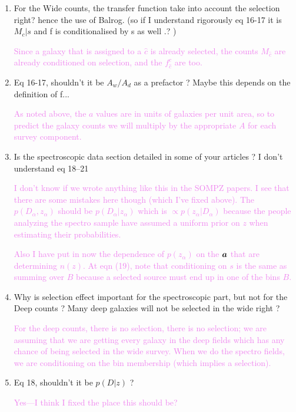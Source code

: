\documentclass[11pt,preprint,flushrt]{aastex631}
\newcommand{\veca}{\mbox{\boldmath $a$}}
\newcommand\answer[1]{\textcolor{violet}{#1}}
\begin{document}
\begin{enumerate}
\item For the Wide counts, the transfer function take into account the
selection right? hence the use of Balrog. (so if I understand
rigorously eq 16-17 it is $M_c|s$ and f is conditionalised by s as well
.? )

\answer{Since a galaxy that is assigned to a $\hat c$ is already
  selected, the counts $M_{\hat c}$ are already conditioned on
  selection, and the $f^c_{\hat c}$ are too.}

\item Eq 16-17, shouldn't it be $A_w/A_d$ as a prefactor ? Maybe this
  depends on the definition of f...

\answer{As noted above, the $a$ values are in units of galaxies per
  unit area, so to predict the galaxy counts we will multiply by the
  appropriate $A$ for each survey component.}
  
\item Is the spectroscopic data section detailed in some of your articles ?
  I don't understand eq 18--21

  \answer{I don't know if we wrote anything like this in the SOMPZ
    papers.  I see that there are some mistakes here though (which
    I've fixed above).  The $p(D_\alpha, z_\alpha)$ should be
    $p(D_\alpha | z_\alpha)$ which is $\propto p(z_\alpha | D_\alpha)$
    because the people analyzing the spectro sample have assumed a
    uniform prior on $z$ when estimating their probabilities.}

\answer{Also I have put in now the dependence of $p(z_\alpha)$ on the
  $\veca$ that are determining $n(z)$.  At eqn (19), note that
  conditioning on $s$ is the same as summing over $B$ because a
  selected source must end up in one of the bins $B$.}

\item Why is selection effect important for the spectroscopic part, but not
for the Deep counts ? Many  deep galaxies will not be selected in the
wide right ?

\answer{For the deep counts, there is no selection, there is no
  selection; we are assuming that we are getting every galaxy in the
  deep fields which has any chance of being selected in the wide
  survey.  When we do the spectro fields, we are conditioning on the
  bin membership (which implies a selection).}

\item Eq 18, shouldn't it be $p(D|z)$ ?

  \answer{Yes---I think I fixed the place this should be?}


\end{enumerate}
\end{document}
